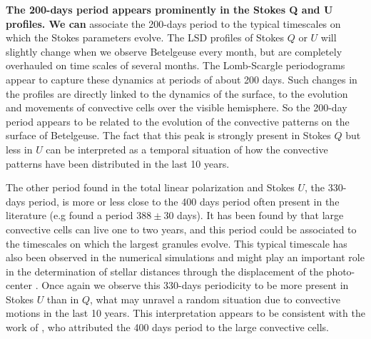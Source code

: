 \documentclass{aa}
\begin{document}
\textbf{The 200-days period appears prominently in the Stokes Q and U profiles. We can }
associate the 200-days period to the typical timescales on which the Stokes parameters evolve. 
The LSD profiles of Stokes $Q$ or $U$ will slightly change when we observe Betelgeuse every month, but are completely overhauled 
on time scales of several months. The Lomb-Scargle periodograms appear to capture these dynamics at periods of about 200 days.
 Such changes in the profiles are directly linked to the dynamics of the surface,  to  the evolution and movements 
of convective cells over the visible hemisphere. So the 200-day period appears to be related to the evolution of the convective patterns 
on the surface of Betelgeuse.  The fact that this peak is strongly present in Stokes $Q$ but less in $U$ 
can be interpreted as a temporal situation of how the convective patterns have been distributed in the last 10 years.

The other period found in the total linear polarization and Stokes $U$, the 330-days period, is more or less close to the 400 days period 
often present in the literature (e.g \cite{kiss_variability_2006} found a period $388 \pm 30$ days). It has been found
by \cite{lopez_ariste_convective_2018} that large convective cells can live  one  to two years, and this period could be associated to the 
timescales on which the largest granules evolve. This typical timescale has also been observed in the numerical simulations and might 
play an important role in the determination of stellar distances through the displacement of the photo-center \citep{chiavassa_probing_2022}. 
Once again we observe this 330-days periodicity to be more present in Stokes $U$ than in $Q$, what may unravel a 
random situation due to convective motions in the last 10 years. This interpretation appears to be  consistent with the work of \cite{gray_mass_2008}, 
who attributed the 400 days period to the large convective cells.  
\end{document}
